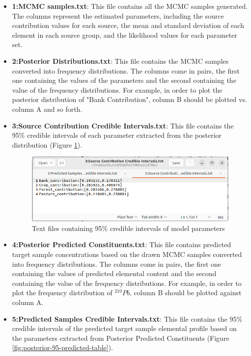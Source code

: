 \documentclass[12pt]{report}
\begin{document}
\begin{itemize}
    \item \textbf{1:MCMC samples.txt}: This file contains all the MCMC samples generated. The columns represent the estimated parameters, including the source contribution values for each source, the mean and standard deviation of each element in each source group, and the likelihood values for each parameter set.
    \item \textbf{2:Posterior Distributions.txt}: This file contains the MCMC samples converted into frequency distributions. The columns come in pairs, the first one containing the values of the parameters and the second containing the value of the frequency distributions. For example, in order to plot the posterior distribution of "Bank Contribution", column B should be plotted vs. column A and so forth. 
    \item \textbf{3:Source Contribution Credible Intervals.txt}: This file contains the 95\% credible intervals of each parameter extracted from the posterior distribution (Figure \ref{fig:posterior-95-table}).

    \begin{figure}[ht]
    \centering
    \includegraphics[width=14cm]{Figures/95p_CI_table.png} 
    \caption{Text files containing 95\% credible intervals of model parameters}
    \label{fig:posterior-95-table}
    \end{figure}
    \FloatBarrier
    
    \item \textbf{4:Posterior Predicted Constituents.txt}: This file contains predicted target sample concentrations based on the drawn MCMC samples converted into frequency distributions. The columns come in pairs, the first one containing the values of predicted elemental content and the second containing the value of the frequency distributions. For example, in order to plot the frequency distribution of $^{210}Pb$, column B should be plotted against column A. 
    
    \item \textbf{5:Predicted Samples Credible Intervals.txt}: This file contains the 95\% credible intervals of the predicted target sample elemental profile based on the parameters extracted from Posterior Predicted Constituents (Figure \ref{fig:posterior-95-predicted-table}).


\end{itemize}
\end{document}
